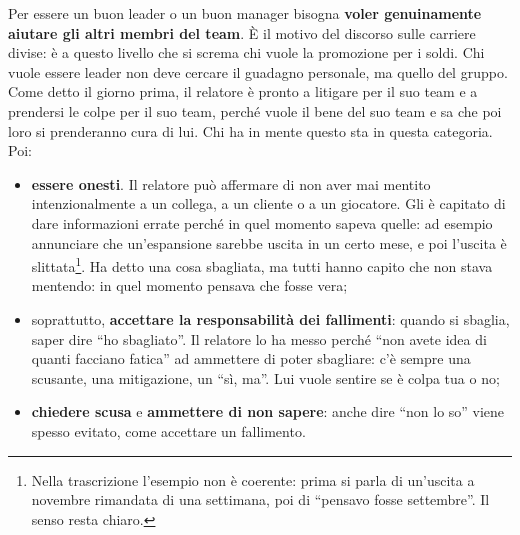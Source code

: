 Per essere un buon leader o un buon manager bisogna \textbf{voler genuinamente aiutare gli altri
membri del team}. È il motivo del discorso sulle carriere divise: è a questo livello che si
screma chi vuole la promozione per i soldi. Chi vuole essere leader non deve cercare il guadagno
personale, ma quello del gruppo. Come detto il giorno prima, il relatore è pronto a litigare per il
suo team e a prendersi le colpe per il suo team, perché vuole il bene del suo team e sa che poi loro
si prenderanno cura di lui. Chi ha in mente questo sta in questa categoria. Poi:
\begin{itemize}
  \item \textbf{essere onesti}. Il relatore può affermare di non aver mai mentito
        intenzionalmente a un collega, a un cliente o a un giocatore. Gli è capitato di dare
        informazioni errate perché in quel momento sapeva quelle: ad esempio annunciare che
        un'espansione sarebbe uscita in un certo mese, e poi l'uscita è slittata\footnote{Nella
        trascrizione l'esempio non è coerente: prima si parla di un'uscita a novembre rimandata
        di una settimana, poi di ``pensavo fosse settembre''. Il senso resta chiaro.}. Ha detto
        una cosa sbagliata, ma tutti hanno capito che non stava mentendo: in quel momento pensava
        che fosse vera;
  \item soprattutto, \textbf{accettare la responsabilità dei fallimenti}: quando si sbaglia,
        saper dire ``ho sbagliato''. Il relatore lo ha messo perché ``non avete idea di quanti
        facciano fatica'' ad ammettere di poter sbagliare: c'è sempre una scusante, una
        mitigazione, un ``sì, ma''. Lui vuole sentire se è colpa tua o no;
  \item \textbf{chiedere scusa} e \textbf{ammettere di non sapere}: anche dire ``non lo so'' viene
        spesso evitato, come accettare un fallimento.
\end{itemize}

